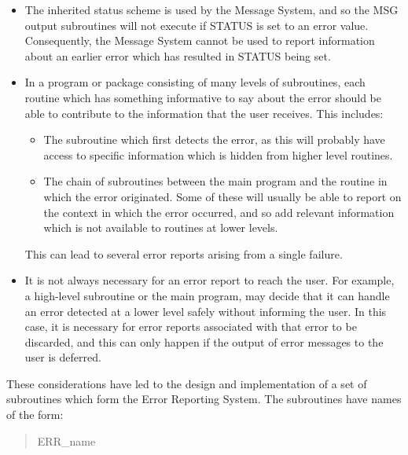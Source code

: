 \documentclass[twoside,11pt]{starlink}
\begin{document}
\begin {itemize}
\item The inherited status scheme is used by the Message System, and so the
MSG output subroutines will not execute if STATUS is set to an error value.
Consequently, the Message System cannot be used to report information about
an earlier error which has resulted in STATUS being set.

\item In a program or package consisting of many levels of subroutines, each
routine which has something informative to say about the error should be
able to contribute to the information that the user receives.
This includes:

\begin {itemize}
\item The subroutine which first detects the error, as this will probably
have access to specific information which is hidden from higher level
routines.

\item The chain of subroutines between the main program and the routine in
which the error originated.
Some of these will usually be able to report on the context in which the error
occurred, and so add relevant information which is not available to routines
at lower levels.
\end {itemize}

This can lead to several error reports arising from a single failure.

\item It is not always necessary for an error report to reach the user.
For example, a high-level subroutine or the main program, may decide that it
can handle an error detected at a lower level safely without informing the
user.
In this case, it is necessary for error reports associated with that
error to be discarded, and this can only happen if the output of error
messages to the user is deferred.

\end {itemize}

These considerations have led to the design and implementation of a set of
subroutines which form the Error Reporting System.
The subroutines have names of the form:

\begin {quote}
\begin {small}
\begin{terminalv}
ERR_name
\end{terminalv}
\end {small}
\end {quote}
\end{document}
